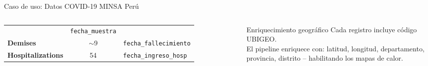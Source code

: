 \documentclass[aspectratio=169, 10pt]{beamer}
\begin{document}
\begin{frame}{Caso de uso: Datos COVID-19 MINSA Per\'u}
\begin{columns}[c]
\begin{tabular}{>{\bfseries\small}l
                      >{\centering\arraybackslash\small}c
                      >{\small}l}
          & \texttt{\scriptsize fecha\_muestra} \\
        \textcolor{alertred}{Demises}
          & $\sim$9
          & \texttt{\scriptsize fecha\_fallecimiento} \\
        \textcolor{warningorange}{Hospitalizations}
          & 54
          & \texttt{\scriptsize fecha\_ingreso\_hosp} \\
        \bottomrule
      \end{tabular}
      \vspace{8pt}
      \begin{exampleblock}{Enriquecimiento geogr\'afico}
        \small
        Cada registro incluye c\'odigo UBIGEO.\\
        El pipeline enriquece con:
        latitud, longitud, departamento, provincia,
        distrito -- habilitando los mapas de calor.
      \end{exampleblock}
  \end{columns}
\end{frame}
\end{document}
